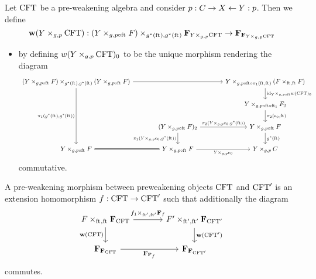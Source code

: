 \begin{defn}
Let $\mathrm{CFT}$ be a pre-weakening algebra and consider $p:C\rightarrow X\leftarrow Y:p$.
Then we define
\begin{equation*}
\mathbf{w}(\cobesys{Y}{\stesys}{g}{p}):
  \cobesys{(\pullback{Y}{\stesysf}{g}{p\circ\eft})}{\famesys{\cobesys{Y}{\stesys}{g}{p}}}{g^\ast(\eft)}{g^\ast(\eft)}\to\famesys{\famesys{\cobesys{Y}{\stesys}{g}{p}}}
\end{equation*}
\begin{itemize}
\item by defining $w(\cobesys{Y}{\stesys}{g}{p})_0$ to be the unique morphism
rendering the diagram
\begin{equation*}
\begin{tikzcd}[column sep=large]
\pullback
  {\pullback{Y}{\stesysf}{g}{p\circ\eft}}
  {\pullback{Y}{\stesysf}{g}{p\circ\eft}}
  {g^\ast(\eft)}
  {g^\ast(\eft)}
  \ar{rr}
  \ar{ddd}[swap]{\pullbackpr{1}{g^\ast(\eft)}{g^\ast(\eft)}}
  &
  {}&
\pullback
  {Y}
  {\pullback{\stesysf}{\stesysf}{\eft}{\eft}}
  {g}
  {p\circ\eft\circ\pullbackpr{1}{\eft}{\eft}}
  \ar{d}{\pullback{\catid{Y}}{w(\stesys)_0}{g}{p\circ\eft}}
  \\
  {}&
  {}&
\pullback{Y}{\stesysf_2}{g}{p\circ\eft\circ\eft[1]}
  \ar{d}{\pullbackpr{2}{\ectxext}{\eft}}
  \\
  {}&
(\pullback{Y}{\stesysf}{g}{p\circ\eft})_2
  \ar{r}{\pullbackpr{2}{\cobesys{Y}{\ectxext}{g}{p}}{g^\ast(\eft)}}
  \ar{d}[swap]{\pullbackpr{1}{\cobesys{Y}{\ectxext}{g}{p}}{g^\ast(\eft)}}
  &
\pullback{Y}{\stesysf}{g}{p\circ\eft}
  \ar{d}{g^\ast(\eft)}
  \\
\pullback{Y}{\stesysf}{g}{p\circ\eft}
  \ar[equals]{r}
  &
\pullback{Y}{\stesysf}{g}{p\circ\eft}
  \ar{r}[swap]{\cobesys{Y}{\ectxext}{g}{p}}
  &
\pullback{Y}{\stesysc}{g}{p}
\end{tikzcd}
\end{equation*}
commutative.
\end{itemize}
\end{defn}

\begin{defn}
A pre-weakening morphism between preweakening objects $\mathrm{CFT}$ and $\mathrm{CFT}'$ is an
extension homomorphism $f:\mathrm{CFT}\to \mathrm{CFT}'$ such that additionally the diagram
\begin{equation*}
\begin{tikzcd}[column sep=large]
\cobesys{\stesysf}{\famesys{\stesys}}{\eft}{\eft}
  \ar{d}[swap]{\mathbf{w}(\stesys)}
  \ar{r}{\pullback{f_1}{\famehom{f}}{\eft'}{\eft'}}
  &
\cobesys{\stesysf'}{\famesys{\stesys'}}{\eft'}{\eft'}
  \ar{d}{\mathbf{w}(\stesys')}
  \\
\famesys{\famesys{\stesys}}
  \ar{r}[swap]{\famehom{\famehom{f}}}
  &
\famesys{\famesys{\stesys'}}
\end{tikzcd}
\end{equation*}
commutes.
\end{defn}

